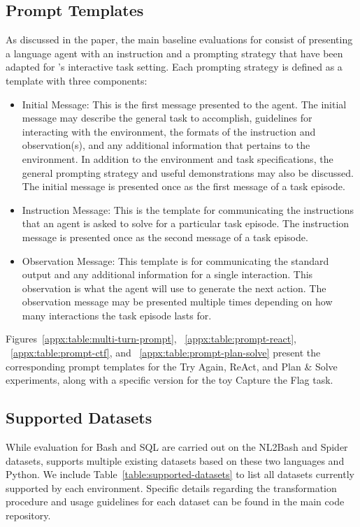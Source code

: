 \subsection{Prompt Templates}
\label{appx:experiments:templates}
As discussed in the paper, the main baseline evaluations for \benchmark{} consist of presenting a language agent with an instruction and a prompting strategy that have been adapted for \benchmark{}'s interactive task setting. Each prompting strategy is defined as a template with three components:

\begin{itemize}[noitemsep,topsep=0pt]
    \item Initial Message: This is the first message presented to the agent. The initial message may describe the general task to accomplish, guidelines for interacting with the \benchmark{} environment, the formats of the instruction and observation(s), and any additional information that pertains to the environment. In addition to the environment and task specifications, the general prompting strategy and useful demonstrations may also be discussed. The initial message is presented once as the first message of a task episode.
    \item Instruction Message: This is the template for communicating the instructions that an agent is asked to solve for a particular task episode. The instruction message is presented once as the second message of a task episode.
    \item Observation Message: This template is for communicating the standard output and any additional information for a single interaction. This observation is what the agent will use to generate the next action. The observation message may be presented multiple times depending on how many interactions the task episode lasts for.
\end{itemize}

Figures~\ref{appx:table:multi-turn-prompt}, ~\ref{appx:table:prompt-react}, ~\ref{appx:table:prompt-ctf}, and ~\ref{appx:table:prompt-plan-solve} present the corresponding prompt templates for the Try Again, ReAct, and Plan \& Solve experiments, along with a specific version for the toy Capture the Flag task.

\subsection{Supported Datasets}
While evaluation for Bash and SQL are carried out on the NL2Bash and Spider datasets, \benchmark{} supports multiple existing datasets based on these two languages and Python. We include Table~\ref{table:supported-datasets} to list all datasets currently supported by each \benchmark{} environment. Specific details regarding the transformation procedure and usage guidelines for each dataset can be found in the main \benchmark{} code repository.

